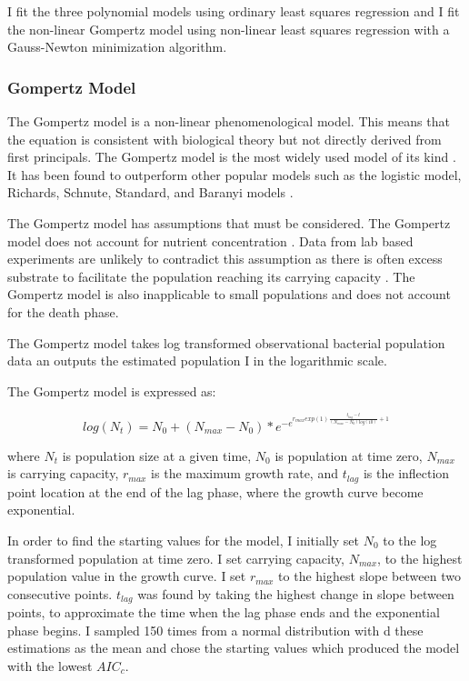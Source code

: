 \documentclass[11pt]{article}
\begin{document}
  I fit the three polynomial models using ordinary least squares regression and I fit the non-linear Gompertz model using non-linear least squares regression with a Gauss-Newton minimization algorithm.
  \subsubsection{Gompertz Model}
  The Gompertz model is a non-linear phenomenological model. This means that the equation is consistent with biological theory but not directly derived from first principals. The Gompertz model is the most widely used model of its kind \citep{Peleg2011}. It has been found to outperform other popular models such as the logistic model, Richards, Schnute, Standard, and Baranyi models \citep{Peleg2011,Zwietering1990}.

  The Gompertz model has assumptions that must be considered. The Gompertz model does not account for nutrient concentration \citep{Allen2018}. Data from lab based experiments are unlikely to contradict this assumption as there is often excess substrate to facilitate the population reaching its carrying capacity \citep{Zwietering1990}. The Gompertz model is also inapplicable to small populations \citep{Allen2018} and does not account for the death phase. 

  The Gompertz model takes log transformed observational bacterial population data an outputs the  estimated population I in the logarithmic scale.

  The Gompertz model is expressed as:


  \begin{equation}
    log(N_{t}) = N_{0} + (N_{max} - N_{0})* e^{-e^{r_{max}exp(1)\frac{t_{lag}-t}{(N_{max}- N_{0})log(10)}+1}}
  \end{equation}
  
  where $N_{t}$ is population size at a given time, $N_{0}$  is population at time zero, $N_{max}$  is carrying capacity, $r_{max}$ is the maximum growth rate, and $t_{lag}$  is the inflection point location at the end of the lag phase, where the growth curve become exponential. 

  In order to find the starting values for the model, I initially set $N_{0}$ to the log transformed population at time zero. I set carrying capacity, $N_{max}$, to the highest population value in the growth curve. I set $r_{max}$ to the highest slope between two consecutive points. $t_{lag}$ was found by taking the highest change in slope between points, to approximate the time when the lag phase ends and the exponential phase begins. I sampled 150 times from a normal distribution with d these estimations as the mean and chose the starting values which produced the model with the lowest $AIC_{c}$.
  
\end{document}
